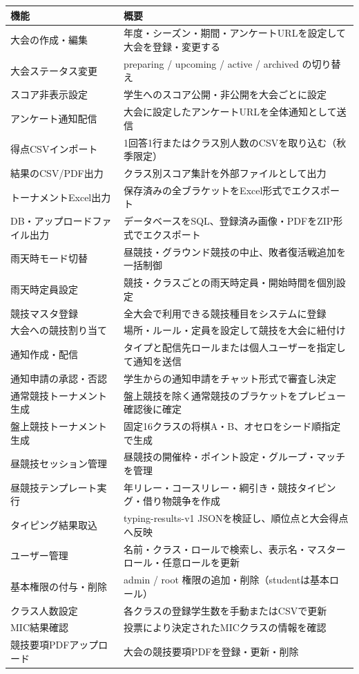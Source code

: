 \documentclass[12pt]{ltjsarticle}
\begin{document}
\begin{longtable}{p{4.5cm}p{9cm}}
\toprule
\textbf{機能} & \textbf{概要} \\
\midrule
\endhead
大会の作成・編集 & 年度・シーズン・期間・アンケートURLを設定して大会を登録・変更する \\
\midrule
大会ステータス変更 & preparing / upcoming / active / archived の切り替え \\
\midrule
スコア非表示設定 & 学生へのスコア公開・非公開を大会ごとに設定 \\
\midrule
アンケート通知配信 & 大会に設定したアンケートURLを全体通知として送信 \\
\midrule
得点CSVインポート & 1回答1行またはクラス別人数のCSVを取り込む（秋季限定） \\
\midrule
結果のCSV/PDF出力 & クラス別スコア集計を外部ファイルとして出力 \\
\midrule
トーナメントExcel出力 & 保存済みの全ブラケットをExcel形式でエクスポート \\
\midrule
DB・アップロードファイル出力 & データベースをSQL、登録済み画像・PDFをZIP形式でエクスポート \\
\midrule
雨天時モード切替 & 昼競技・グラウンド競技の中止、敗者復活戦追加を一括制御 \\
\midrule
雨天時定員設定 & 競技・クラスごとの雨天時定員・開始時間を個別設定 \\
\midrule
競技マスタ登録 & 全大会で利用できる競技種目をシステムに登録 \\
\midrule
大会への競技割り当て & 場所・ルール・定員を設定して競技を大会に紐付け \\
\midrule
通知作成・配信 & タイプと配信先ロールまたは個人ユーザーを指定して通知を送信 \\
\midrule
通知申請の承認・否認 & 学生からの通知申請をチャット形式で審査し決定 \\
\midrule
通常競技トーナメント生成 & 盤上競技を除く通常競技のブラケットをプレビュー確認後に確定 \\
\midrule
盤上競技トーナメント生成 & 固定16クラスの将棋A・B、オセロをシード順指定で生成 \\
\midrule
昼競技セッション管理 & 昼競技の開催枠・ポイント設定・グループ・マッチを管理 \\
\midrule
昼競技テンプレート実行 & 年リレー・コースリレー・綱引き・競技タイピング・借り物競争を作成 \\
\midrule
タイピング結果取込 & typing-results-v1 JSONを検証し、順位点と大会得点へ反映 \\
\midrule
ユーザー管理 & 名前・クラス・ロールで検索し、表示名・マスターロール・任意ロールを更新 \\
\midrule
基本権限の付与・削除 & admin / root 権限の追加・削除（studentは基本ロール） \\
\midrule
クラス人数設定 & 各クラスの登録学生数を手動またはCSVで更新 \\
\midrule
MIC結果確認 & 投票により決定されたMICクラスの情報を確認 \\
\midrule
競技要項PDFアップロード & 大会の競技要項PDFを登録・更新・削除 \\
\bottomrule
\end{longtable}
\end{document}
